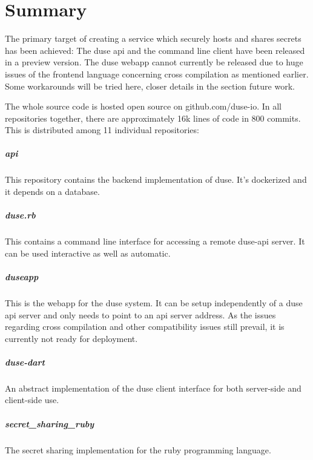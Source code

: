 \chapter{Summary}

The primary target of creating a service which securely hosts and shares
secrets has been achieved: The duse api and the command line client have
been released in a preview version. The duse webapp cannot currently be
released due to huge issues of the frontend language concerning cross
compilation as mentioned earlier. Some workarounds will be tried here,
closer details in the section future work.

The whole source code is hosted open source on github.com/duse-io.
In all repositories together, there are approximately 16k lines of code in
800 commits. This is distributed among 11 individual repositories:

\paragraph{api} This repository contains the backend implementation of
duse. It's dockerized and it depends on a database.

\paragraph{duse.rb} This contains a command line interface for accessing
a remote duse-api server. It can be used interactive as well as automatic.

\paragraph{duseapp} This is the webapp for the duse system. It can be
setup independently of a duse api server and only needs to point to an
api server address. As the issues regarding cross compilation and other
compatibility issues still prevail, it is currently not ready for deployment.

\paragraph{duse-dart} An abstract implementation of the duse client interface
for both server-side and client-side use.

\paragraph{secret\_sharing\_ruby} The secret sharing implementation for the
ruby programming language.

